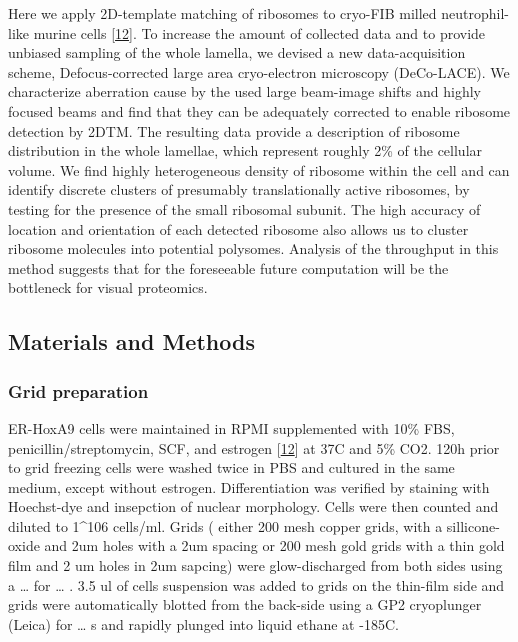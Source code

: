 \documentclass[
]{article}
\begin{document}
Here we apply 2D-template matching of ribosomes to cryo-FIB milled
neutrophil-like murine cells {[}\protect\hyperlink{ref-1B9Vt9eYu}{12}{]}. To increase the
amount of collected data and to provide unbiased sampling of the whole
lamella, we devised a new data-acquisition scheme, Defocus-corrected
large area cryo-electron microscopy (DeCo-LACE). We characterize
aberration cause by the used large beam-image shifts and highly focused
beams and find that they can be adequately corrected to enable ribosome
detection by 2DTM. The resulting data provide a description of ribosome
distribution in the whole lamellae, which represent roughly 2\% of the
cellular volume. We find highly heterogeneous density of ribosome within
the cell and can identify discrete clusters of presumably
translationally active ribosomes, by testing for the presence of the
small ribosomal subunit. The high accuracy of location and orientation
of each detected ribosome also allows us to cluster ribosome molecules
into potential polysomes. Analysis of the throughput in this method
suggests that for the foreseeable future computation will be the
bottleneck for visual proteomics.

\hypertarget{materials-and-methods}{%
\subsection{Materials and Methods}\label{materials-and-methods}}

\hypertarget{grid-preparation}{%
\subsubsection{Grid preparation}\label{grid-preparation}}

ER-HoxA9 cells were maintained in RPMI supplemented with 10\% FBS,
penicillin/streptomycin, SCF, and estrogen {[}\protect\hyperlink{ref-1B9Vt9eYu}{12}{]} at
37C and 5\% CO2. 120h prior to grid freezing cells were washed twice in PBS and
cultured in the same medium, except without estrogen. Differentiation was
verified by staining with Hoechst-dye and insepction of nuclear morphology.
Cells were then counted and diluted to 1\^{}106 cells/ml. Grids ( either 200 mesh
copper grids, with a sillicone-oxide and 2um holes with a 2um spacing or 200
mesh gold grids with a thin gold film and 2 um holes in 2um sapcing) were
glow-discharged from both sides using a \ldots{} for \ldots{} . 3.5 ul of cells suspension
was added to grids on the thin-film side and grids were automatically blotted
from the back-side using a GP2 cryoplunger (Leica) for \ldots{} s and rapidly plunged
into liquid ethane at -185C.
\end{document}

